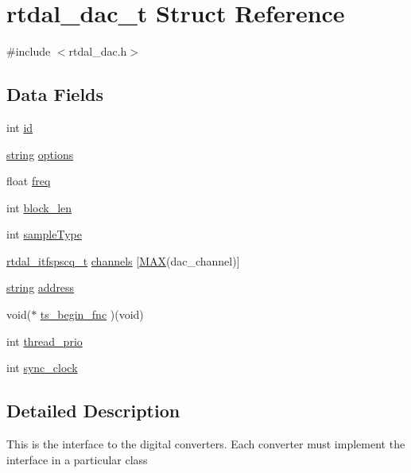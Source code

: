 \hypertarget{structrtdal__dac__t}{\section{rtdal\-\_\-dac\-\_\-t Struct Reference}
\label{structrtdal__dac__t}
}


{\ttfamily \#include $<$rtdal\-\_\-dac.\-h$>$}

\subsection*{Data Fields}
\begin{DoxyCompactItemize}
\item 
int \hyperlink{structrtdal__dac__t_aa45909405d029611621f81816652122f}{id}
\item 
\hyperlink{str_8h_a25093e36e9fb377b246945a84745823f}{string} \hyperlink{structrtdal__dac__t_aa224b5d176deb00b976d486140f750e9}{options}
\item 
float \hyperlink{structrtdal__dac__t_afc905cd4e7aa8c25395806917a05a305}{freq}
\item 
int \hyperlink{structrtdal__dac__t_a716854e8850dfab1ddbcbd779352c678}{block\-\_\-len}
\item 
int \hyperlink{structrtdal__dac__t_a3eb33c0022d57c639dbb3e5c7b1efd57}{sample\-Type}
\item 
\hyperlink{structrtdal__itfspscq__t}{rtdal\-\_\-itfspscq\-\_\-t} \hyperlink{structrtdal__dac__t_a89737e1e20878d8efc67ad8f47b72195}{channels} \mbox{[}\hyperlink{objects__max_8h_a5ec0a30768a338a08d7e0c296475a2cf}{M\-A\-X}(dac\-\_\-channel)\mbox{]}
\item 
\hyperlink{str_8h_a25093e36e9fb377b246945a84745823f}{string} \hyperlink{structrtdal__dac__t_a61aaedfb5e9406837a83cfa0a57668bc}{address}
\item 
void($\ast$ \hyperlink{structrtdal__dac__t_a1ac668320b27721486d68e597e95d040}{ts\-\_\-begin\-\_\-fnc} )(void)
\item 
int \hyperlink{structrtdal__dac__t_a70fef8cd567be40adeab9ca4c30ab235}{thread\-\_\-prio}
\item 
int \hyperlink{structrtdal__dac__t_a46edf9cb34c2b8541d1979a1949d4998}{sync\-\_\-clock}
\end{DoxyCompactItemize}


\subsection{Detailed Description}
This is the interface to the digital converters. Each converter must implement the interface in a particular class 

